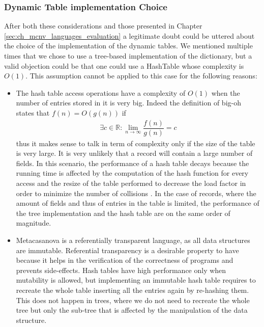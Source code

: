 \subsubsection{Dynamic Table implementation Choice}
After both these considerations and those presented in Chapter \ref{sec:ch_mcnv_languages_evaluation} a legitimate doubt could be uttered about the choice of the implementation of the dynamic tables. We mentioned multiple times that we chose to use a tree-based implementation of the dictionary, but a valid objection could be that one could use a HashTable whose complexity is $O(1)$. This assumption cannot be applied to this case for the following reasons:

\begin{itemize}
\item The hash table access operations have a complexity of $O(1)$ when the number of entries stored in it is very big. Indeed the definition of big-oh states that $f(n) = O(g(n))$ if
\begin{align*}
\exists c \in \mathbb{R}: \lim_{n \to \infty}\dfrac{f(n)}{g(n)} = c
\end{align*}
\noindent
thus it makes sense to talk in term of complexity only if the size of the table is very large. It is very unlikely that a record will contain a large number of fields. In this scenario, the performance of a hash table decays because the running time is affected by the computation of the hash function for every access and the resize of the table performed to decrease the load factor in order to minimize the number of collisions \cite{cormen2001introduction}. In the case of records, where the amount of fields and thus of entries in the table is limited, the performance of the tree implementation and the hash table are on the same order of magnitude.
\item  Metacasanova is a referentially transparent language, as all data structures are immutable. Referential transparency is a desirable property to have because it helps in the verification of the correctness of programs \cite{linger1988case, trammell1996incremental} and prevents side-effects. Hash tables have high performance only when mutability is allowed, but implementing an immutable hash table requires to recreate the whole table inserting all the entries again by re-hashing them. This does not happen in trees, where we do not need to recreate the whole tree but only the sub-tree that is affected by the manipulation of the data structure.
\end{itemize}

